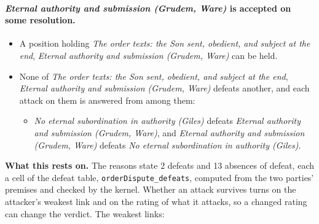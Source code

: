 \documentclass[11pt,paper=\testimonypaper,DIV=13,parskip=false]{scrartcl}
\begin{document}
\paragraph{\emph{Eternal authority and submission (Grudem, Ware)} is accepted on some resolution.}
\begin{itemize}
\item A position holding \emph{The order texts: the Son sent, obedient, and subject at the end}, \emph{Eternal authority and submission (Grudem, Ware)} can be held.
\item None of \emph{The order texts: the Son sent, obedient, and subject at the end}, \emph{Eternal authority and submission (Grudem, Ware)} defeats another, and each attack on them is answered from among them:
\begin{itemize}
\item \emph{No eternal subordination in authority (Giles)} defeats \emph{Eternal authority and submission (Grudem, Ware)}, and \emph{Eternal authority and submission (Grudem, Ware)} defeats \emph{No eternal subordination in authority (Giles)}.
\end{itemize}
\end{itemize}
\par\noindent\textbf{What this rests on.} The reasons state 2 defeats and 13 absences of defeat, each a cell of the defeat table, \texttt{order\allowbreak{}Dispute\_\allowbreak{}defeats}, computed from the two parties' premises and checked by the kernel. Whether an attack survives turns on the attacker's weakest link and on the rating of what it attacks, so a changed rating can change the verdict. The weakest links:
\end{document}
